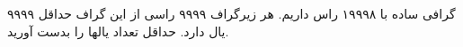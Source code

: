 گرافی ساده با ۱۹۹۹۸ راس داریم.
هر زیرگراف ۹۹۹۹ راسی از این گراف حداقل ۹۹۹۹ یال دارد.
حداقل تعداد یالها را بدست آورید.